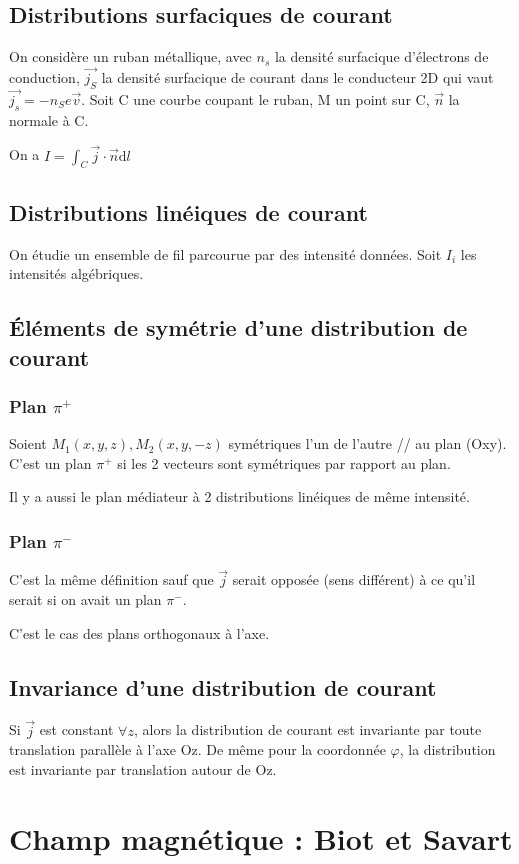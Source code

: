 \documentclass[french]{yLectureNote}
\renewcommand{\vec}{\overrightarrow}
\newcommand{\dd}{\mathrm{d}}
\newcommand{\pip}{\pi^+}
\newcommand{\pim}{\pi^-}
\begin{document}
\section{Distributions surfaciques de courant}
On considère un ruban métallique, avec \(n_s\) la densité surfacique d'électrons de conduction, \(\vec{j_S}\) la densité surfacique de courant dans le conducteur 2D qui vaut \(\vec{j_s} = -n_S e\vec{v}\). Soit C une courbe coupant le ruban, M un point sur C, \(\vec{n}\) la normale à C.

On a \(I = \int_C \vec{j}\cdot \vec{n}\dd l\)
\section{Distributions linéiques de courant}
On étudie un ensemble de fil parcourue par des intensité données.
Soit \(I_i\) les intensités algébriques.
\section{Éléments de symétrie d'une distribution de courant}
\subsection{Plan \(\pip\)}
Soient \(M_1(x,y,z), M_2(x,y,-z)\) symétriques l'un de l'autre // au plan (Oxy). C'est un plan \(\pip\) si les 2 vecteurs sont symétriques par rapport au plan.

Il y a aussi le plan médiateur à 2 distributions linéiques de m\^eme intensité.
\subsection{Plan \(\pim\)}
C'est la m\^eme définition sauf que \(\vec{j}\) serait opposée (sens différent) à ce qu'il serait si on avait un plan \(\pim\).

C'est le cas des plans orthogonaux à l'axe.
\section{Invariance d'une distribution de courant}
Si \(\vec{j}\) est constant \(\forall z\), alors la distribution de courant est invariante par toute translation parallèle à l'axe Oz. De m\^eme pour la coordonnée \(\varphi\), la distribution est invariante par translation autour de Oz.
\chapter{Champ magnétique : Biot et Savart}
\end{document}
